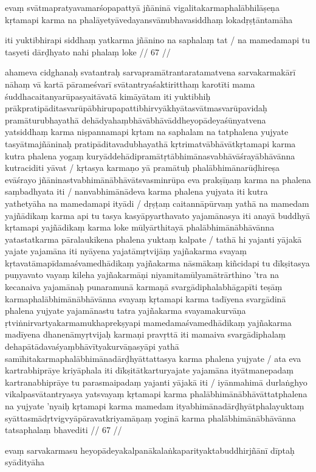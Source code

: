 evaṃ svātmapratyavamarśopapattyā jñāninā vigalitakarmaphalābhilāṣeṇa kṛtamapi karma na phalāyetyāvedayansvānubhavasiddhaṃ lokadṛṣṭāntamāha

iti yuktibhirapi siddhaṃ yatkarma jñānino na saphalaṃ tat  /
na mamedamapi tu tasyeti dārḍhyato nahi phalaṃ loke  // 67  //

ahameva cidghanaḥ svatantraḥ sarvapramātrantaratamatvena sarvakarmakārī nāhaṃ vā kartā pārameśvarī svātantryaśaktiritthaṃ karotīti mama śuddhacaitanyarūpasyaitāvatā kimāyātam iti yuktibhiḥ prākpratipāditasvarūpābhirupapattibhirvyākhyātasvātmasvarūpavidaḥ pramāturubhayathā dehādyahaṃbhāvābhāvāddheyopādeyaśūnyatvena yatsiddhaṃ karma niṣpannamapi kṛtam na saphalam na tatphalena yujyate tasyātmajñāninaḥ pratipāditavadubhayathā kṛtrimatvābhāvātkṛtamapi karma kutra phalena yogaṃ kuryāddehādipramātṛtābhimānasvabhāvāśrayābhāvānna kutraciditi yāvat  / kṛtasya karmaṇo yā pramātuḥ phalābhimānarūḍhireṣa evāśrayo jñāninastvabhimānābhāvātsvasminrūpa eva prakṣīṇaṃ karma na phalena saṃbadhyata iti  / nanvabhimānādeva karma phalena yujyata iti kutra yathetyāha na mamedamapi ityādi  / dṛṣṭaṃ caitannāpūrvaṃ yathā na mamedam yajñādikaṃ karma api tu tasya kasyāpyarthavato yajamānasya iti anayā buddhyā kṛtamapi yajñādikaṃ karma loke mūlyārthitayā phalābhimānābhāvānna yatastatkarma pāralaukikena phalena yuktaṃ kalpate  / tathā hi yajanti yājakā yajate yajamāna iti nyāyena yajatāmṛtvijāṃ yajñakarma svayaṃ kṛtavatāmapīdamaśvamedhādikaṃ yajñakarma nāsmākaṃ kiñcidapi tu dīkṣitasya puṇyavato vayaṃ kileha yajñakarmāṇi niyamitamūlyamātrārthino 'tra na kecanaiva yajamānaḥ punaramunā karmaṇā svargādiphalabhāgapīti teṣāṃ karmaphalābhimānābhāvānna svayaṃ kṛtamapi karma tadīyena svargādinā phalena yujyate yajamānastu tatra yajñakarma svayamakurvāṇa ṛtviṅnirvartyakarmamukhaprekṣyapi mamedamaśvamedhādikaṃ yajñakarma madīyena dhanenāmyṛtvijaḥ karmaṇi pravṛttā iti mamaiva svargādiphalaṃ dehapātādavaśyaṃbhāvītyakurvāṇasyāpi yathā samīhitakarmaphalābhimānadārḍhyāttattasya karma phalena yujyate  / ata eva kartrabhiprāye kriyāphala iti dīkṣitātkarturyajate yajamāna ityātmanepadaṃ kartranabhiprāye tu parasmaipadaṃ yajanti yājakā iti  / iyānmahimā durlaṅghyo vikalpasvātantryasya yatsvayaṃ kṛtamapi karma phalābhimānābhāvāttatphalena
na yujyate 'nyaiḥ kṛtamapi karma mamedam ityabhimānadārḍhyātphalayuktaṃ syāttasmādṛtvigvyāpāravatkriyamāṇaṃ yoginā karma phalābhimānābhāvānna tatsaphalaṃ bhavediti  // 67  //

evaṃ sarvakarmasu heyopādeyakalpanākalaṅkaparityaktabuddhirjñānī dīptaḥ syādityāha

